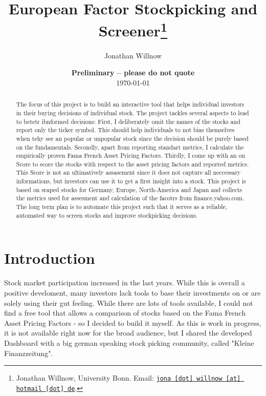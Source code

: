 \documentclass[11pt, a4paper, leqno]{article}
\begin{document}
\title{European Factor Stockpicking and Screener\thanks{Jonathan Willnow, University Bonn. Email: \href{mailto:jona.willnow@hotmail.de}{\nolinkurl{jona [dot] willnow [at] hotmail [dot] de}}.}}

\author{Jonathan Willnow}

\date{
    {\bf Preliminary -- please do not quote}
    \\[1ex]
    \today
}

\maketitle


\begin{abstract}
    The focus of this project is to build an interactive tool that helps individual investors in their buying decisions of individual stock. 
    The project tackles several aspects to lead to betetr ibnformed decisions: First, I deliberately omit the names of the stocks and report only the ticker symbol.
    This should help individuals to not bias themselves when tehy see an popular or unpopular stock since the decision should be purely based on the fundamentals.
    Secondly, apart from reporting standart metrics, I calculate the empirically proven Fama French Asset Pricing Factors. Thirdly, I come up with an on Score to score the stocks
    with respect to the asset pricing factors and reported metrics. This Score is not an ultimatively assasement since it does not capture all neccessary informations, 
    but investors can use it to get a first insight into a stock.
    This project is based on sraped stocks for Germany, Europe, North-America and Japan and collects the metrics used for assesment and calculation of the facotrs
    from finance.yahoo.com. The long term plan is to automate this project such that it serves as a reliable, automated way to screen stocks and improve stockpicking decisions.
\end{abstract}
\clearpage

\section{Introduction} %
\label{sec:introduction}

Stock market participation increased in the last years. While this is overall a positive develoment, many investors lack tools to base their investments on or are solely using their
gut feeling. While there are lots of tools available, I could not find a free tool that allows a comparison of stocks based on the Fama French Asset Pricing Factors - so I 
decided to build it myself. As this is work in progress, it is not available right now for the broad audience, but I shared the developed Dashboard with a big german speaking 
stock picking community, called "Kleine Finanzzeitung".
\end{document}
